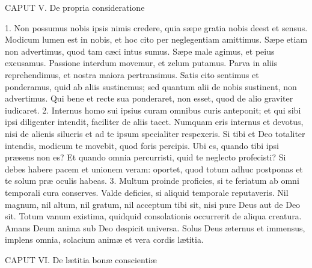 CAPUT V.
De propria consideratione

1. Non possumus nobis ipsis nimis credere, quia sæpe gratia nobis deest et sensus. Modicum lumen est in nobis, et hoc cito per neglegentiam amittimus. Sæpe etiam non advertimus, quod tam cæci intus sumus. Sæpe male agimus, et peius excusamus. Passione interdum movemur, et zelum putamus. Parva in aliis reprehendimus, et nostra maiora pertransimus. Satis cito sentimus et ponderamus, quid ab aliis sustinemus; sed quantum alii de nobis sustinent, non advertimus. Qui bene et recte sua ponderaret, non esset, quod de alio graviter iudicaret.
2. Internus homo sui ipsius curam omnibus curis anteponit; et qui sibi ipsi diligenter intendit, faciliter de aliis tacet. Numquam eris internus et devotus, nisi de alienis silueris et ad te ipsum specialiter respexeris. Si tibi et Deo totaliter intendis, modicum te movebit, quod foris percipis. Ubi es, quando tibi ipsi præsens non es? Et quando omnia percurristi, quid te neglecto profecisti? Si debes habere pacem et unionem veram: oportet, quod totum adhuc postponas et te solum præ oculis habeas.
3. Multum proinde proficies, si te feriatum ab omni temporali cura conserves. Valde deficies, si aliquid temporale reputaveris. Nil magnum, nil altum, nil gratum, nil acceptum tibi sit, nisi pure Deus aut de Deo sit. Totum vanum existima, quidquid consolationis occurrerit de aliqua creatura. Amans Deum anima sub Deo despicit universa. Solus Deus æternus et immensus, implens omnia, solacium animæ et vera cordis lætitia.


CAPUT VI.
De lætitia bonæ conscientiæ

